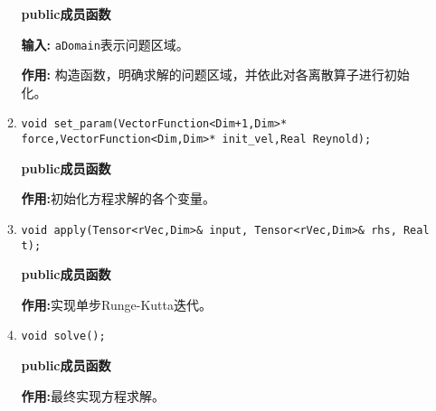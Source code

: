 \documentclass[UTF8]{ctexart}
\theoremstyle{plain}
\theoremstyle{definition}
\theoremstyle{remark}
\begin{document}
\begin{itemize}
\begin{enumerate}
        \textbf{public成员函数}

        \textbf{输入:} \texttt{aDomain}表示问题区域。

        \textbf{作用:} 构造函数，明确求解的问题区域，并依此对各离散算子进行初始化。

        \item \texttt{void set\_param(VectorFunction<Dim+1,Dim>* force,VectorFunction<Dim,Dim>* init\_vel,Real Reynold);}
        
        \textbf{public成员函数}

        \textbf{作用:}初始化方程求解的各个变量。

        \item \texttt{void apply(Tensor<rVec,Dim>\& input, Tensor<rVec,Dim>\& rhs, Real t);}
        
        \textbf{public成员函数}

        \textbf{作用:}实现单步Runge-Kutta迭代。

        \item \texttt{void solve();}
        
        \textbf{public成员函数}

        \textbf{作用:}最终实现方程求解。
    \end{enumerate}
\end{itemize}
\end{document}
